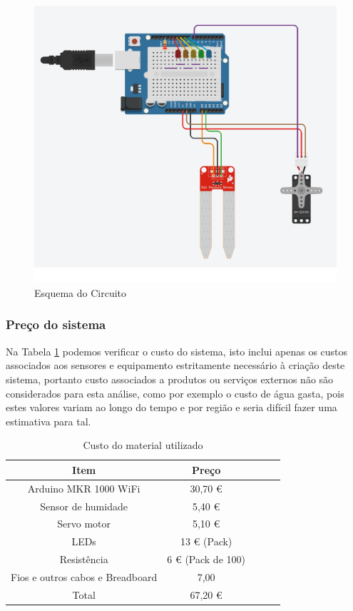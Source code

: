 \documentclass[conference]{IEEEtran}
\begin{document}
\begin{figure}
    \centering
    \includegraphics[scale=0.5]{soil_moisture_circuit_schema.png}
    \caption{Esquema do Circuito}
    \label{fig:circuit}
\end{figure}

\subsubsection{Preço do sistema}

Na Tabela \ref{pricetable} podemos verificar o custo do sistema, 
isto inclui apenas os custos associados aos sensores e equipamento 
estritamente necessário à criação deste sistema, portanto custo associados 
a produtos ou serviços externos não são considerados para esta análise, 
como por exemplo o custo de água gasta, pois estes valores variam ao longo 
do tempo e por região e seria difícil fazer uma estimativa para tal.

\begin{table}[ht]
\centering
\small
\begin{tabular}{|c|c|c|c|c|}
    \hline
    \rowcolor{gray}
    \color{white}Item & \color{white}Preço \\
    \hline
    Arduino MKR 1000 WiFi & 30,70 € \\
    \hline
    Sensor de humidade & 5,40 € \\
    \hline
    Servo motor & 5,10 € \\
    \hline
    LEDs & 13 € (Pack) \\
    \hline
    Resistência & 6 € (Pack de 100) \\
    \hline
    Fios e outros cabos e Breadboard & 7,00 \\
    \hline
    \rowcolor{gray}
    \color{white}Total & \color{white}67,20 € \\
    \hline
\end{tabular}
\vspace{1em}
\caption{Custo do material utilizado}
\label{pricetable}
\end{table}
\end{document}
